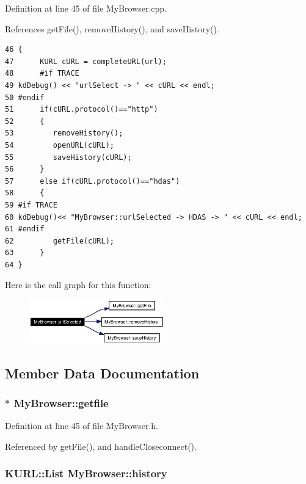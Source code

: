 Definition at line 45 of file My\-Browser.cpp.

References get\-File(), remove\-History(), and save\-History().



\footnotesize\begin{verbatim}46 {
47      KURL cURL = completeURL(url);
48      #if TRACE 
49 kdDebug() << "urlSelect -> " << cURL << endl;     
50 #endif
51      if(cURL.protocol()=="http")
52      {
53         removeHistory();
54         openURL(cURL);
55         saveHistory(cURL);
56      }
57      else if(cURL.protocol()=="hdas")
58      {
59 #if TRACE      
60 kdDebug()<< "MyBrowser::urlSelected -> HDAS -> " << cURL << endl;
61 #endif
62         getFile(cURL);
63      }
64 }
\end{verbatim}\normalsize 


Here is the call graph for this function:\begin{figure}[H]
\begin{center}
\leavevmode
\includegraphics[width=166pt]{classMyBrowser_MyBrowsera2_cgraph}
\end{center}
\end{figure}


\subsection{Member Data Documentation}
\subsubsection{$\ast$ {\bf My\-Browser::getfile}}\label{classMyBrowser_MyBrowsero2}




Definition at line 45 of file My\-Browser.h.

Referenced by get\-File(), and handle\-Closeconnect().
\subsubsection{\setlength{\rightskip}{0pt plus 5cm}KURL::List {\bf My\-Browser::history}}\label{classMyBrowser_MyBrowsero0}




